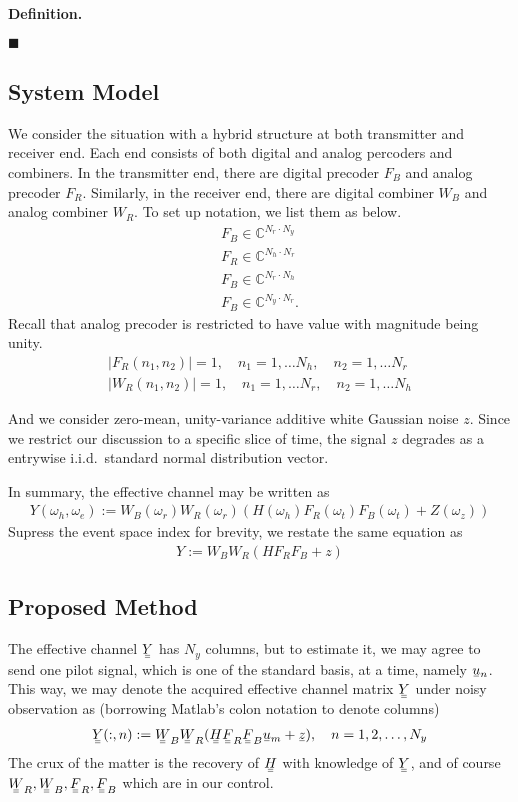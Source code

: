 \documentclass[12pt]{article}
\newcommand{\MB}[1]{\mathbb{#1}}
\newcommand{\V}[1]{\stackunder[1.2pt]{$#1$}{\rule{.9ex}{.075ex}}}
\newcommand{\M}[1]{\V{\V{#1}}}
\newcounter{NumResult}
\newcommand{\myCount}
{
   \stepcounter{NumResult}
   \textbf{\arabic{NumResult}}
}
\newcommand {\Result} [2]
{
   \bigskip
   \myCount \textbf{#1} \par
   {#2} \par
   \hfill \(\blacksquare\)
   \bigskip
}
\begin{document}
\Result
{Definition.}
{
}

\subsection{System Model}

We consider the situation with a hybrid structure at both transmitter and receiver end.
Each end consists of both digital and analog percoders and combiners.
In the transmitter end, there are digital precoder \(F_B\) and analog precoder \(F_R\).
Similarly, in the receiver end, there are digital combiner \(W_B\) and analog combiner \(W_R\).
To set up notation, we list them as below.
\begin{gather}
F_B \in \MB{C}^{N_r \cdot N_y} \\
F_R \in \MB{C}^{N_h \cdot N_r} \\
F_B \in \MB{C}^{N_r \cdot N_h} \\
F_B \in \MB{C}^{N_y \cdot N_r}.
\end{gather}
Recall that analog precoder is restricted to have value with magnitude being unity.
\begin{gather}
 |F_R(n_1,n_2)| =1, \quad
 n_1 =1, \dotsc N_h, \quad
n_2 =1, \dotsc N_r \\
 |W_R(n_1,n_2)| =1, \quad
 n_1 =1, \dotsc N_r, \quad
n_2 =1, \dotsc N_h
\end{gather}

And we consider zero-mean, unity-variance additive white Gaussian noise \(z\).
Since we restrict our discussion to a specific slice of time, the signal \(z\) degrades as a entrywise i.i.d.\ standard normal distribution vector.

In summary, the effective channel may be written as
\begin{gather}
Y (\omega_h, \omega_e)
:=W_B(\omega_r) W_R(\omega_r) ( H(\omega_h) F_R(\omega_t) F_B(\omega_t) +Z(\omega_z) )
\end{gather}
Supress the event space index for brevity, we restate the same equation as
\begin{gather}
Y
:=W_B W_R ( H F_R F_B +z )
\end{gather}

\subsection{Proposed Method}

The effective channel \(\M{Y}\) has \(N_y\) columns, but to estimate it, we may agree to send one pilot signal, which is one of the standard basis, at a time, namely \(\V{u}_n\).
This way, we may denote the acquired effective channel matrix \(\M{Y}\) under noisy observation as (borrowing Matlab's colon notation to denote columns)
\begin{gather}
\M{Y}(:,n)
:=\M{W}_B \M{W}_R ( \M{H} \M{F}_R \M{F}_B \V{u}_m +\V{z} ), \quad
n =1, 2, \dotsc, N_y
\end{gather}
The crux of the matter is the recovery of \(\M{H}\) with knowledge of \(\M{Y}\), and of course \(\M{W}_R, \M{W}_B, \M{F}_R, \M{F}_B\) which are in our control.
\end{document}
